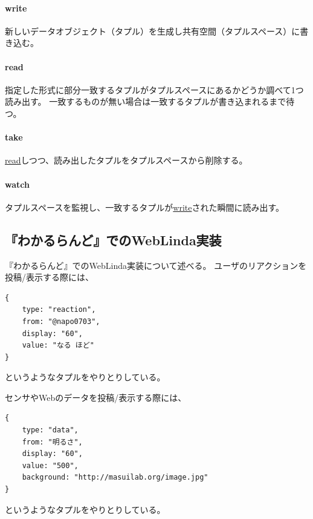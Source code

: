 \vspace{2mm}
\paragraph*{write}
新しいデータオブジェクト（タプル）を生成し共有空間（タプルスペース）に書き込む。

\vspace{4mm}
\paragraph*{read}
指定した形式に部分一致するタプルがタプルスペースにあるかどうか調べて1つ読み出す。
一致するものが無い場合は一致するタプルが書き込まれるまで待つ。

\vspace{2mm}
\paragraph*{take}
\url{read}しつつ、読み出したタプルをタプルスペースから削除する。

\vspace{2mm}
\paragraph*{watch}
タプルスペースを監視し、一致するタプルが\url{write}された瞬間に読み出す。

\subsection{『わかるらんど』でのWebLinda実装}
『わかるらんど』でのWebLinda実装について述べる。
ユーザのリアクションを投稿/表示する際には、
\vspace{2mm}
\begin{verbatim}
{
    type: "reaction",
    from: "@napo0703",
    display: "60",
    value: "なる ほど"
}
\end{verbatim}
\vspace{2mm}
というようなタプルをやりとりしている。

センサやWebのデータを投稿/表示する際には、
\vspace{2mm}
\begin{verbatim}
{
    type: "data",
    from: "明るさ",
    display: "60",
    value: "500",
    background: "http://masuilab.org/image.jpg"
}
\end{verbatim}
\vspace{2mm}
というようなタプルをやりとりしている。

